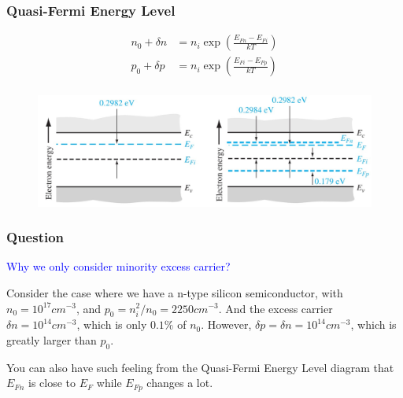 \documentclass{beamer}
\begin{document}
    \begin{frame} \frametitle{Quasi-Fermi Energy Level}
        \begin{equation*}
            \begin{aligned}
                n_0 + \delta n &= n_i \exp \left( \frac{E_{Fn} - E_{Fi}}{kT}  \right) \\
                p_0 + \delta p &= n_i \exp \left( \frac{E_{Fi} - E_{Fp}}{kT}  \right) \\
            \end{aligned}
        \end{equation*}
        \begin{figure}[H]
            \centering
            \includegraphics[width=\linewidth]{Quasi-fermi-level.jpg}
            \label{fig:Quasi-fermi-level.jpg}
        \end{figure}
    \end{frame}

    \begin{frame} \frametitle{Question}
        \textcolor{blue}{Why we only consider minority excess carrier?} \\
        \par Consider the case where we have a n-type silicon semiconductor, with $n_0 = 10^{17}cm ^{-3}$, and $p_0 = n_i^2 / n_0 = 2250cm^{-3}$. And the excess carrier $\delta n = 10^{14} cm^{-3}$, which is only $0.1\%$ of $n_0$. However, $\delta p = \delta n = 10^{14} cm^{-3}$, which is greatly larger than $p_0$.
        \par You can also have such feeling from the Quasi-Fermi Energy Level diagram that $E_{Fn}$ is close to $E_F$ while $E_{Fp}$ changes a lot.
    \end{frame}


\end{document}
